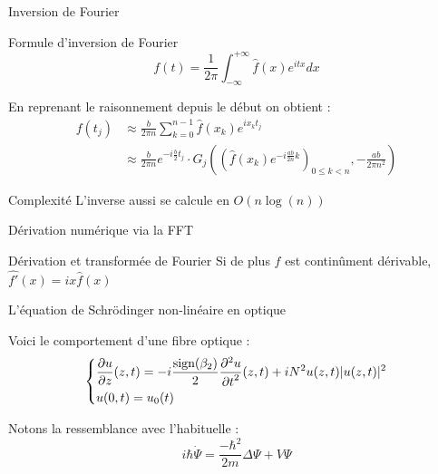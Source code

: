 \documentclass{beamer}
\begin{document}
\begin{frame}{Inversion de Fourier}
  \begin{exampleblock}{Formule d'inversion de Fourier}
$$ f(t) = \frac{1}{2\pi}\int_{-\infty}^{+\infty} \hat{f}(x)e^{itx}dx $$
  \end{exampleblock}

En reprenant le raisonnement depuis le début on obtient :
\begin{align*}
f(t_j)  &\approx \frac{b}{2\pi n}\sum_{k=0}^{n-1}\hat{f}(x_k)e^{i x_k t_j} \\
      &\approx \frac{b}{2\pi n} e^{-i\frac{b}{2}t_j}\cdot G_j\left(\left( \hat{f}(x_k)e^{-i\frac{ab}{2n}k}\right)_{0 \le k < n},  -\frac{ab}{2\pi n^2}\right) 
\end{align*}
\begin{exampleblock}{Complexité}
  L'inverse aussi se calcule en $O(n\log(n))$ 
\end{exampleblock}
\end{frame}

\begin{frame}{Dérivation numérique via la FFT}
  \begin{exampleblock}{Dérivation et transformée de Fourier}
    Si de plus $f$ est continûment dérivable, $\hat{f'}(x)= ix\hat{f}(x)$   
  \end{exampleblock}
    \begin{center}
\end{center}

\end{frame}

\begin{frame}{L'équation de Schrödinger non-linéaire en optique}

  Voici le comportement d'une fibre optique :
\begin{equation*}
  \begin{dcases*}
    \frac{\partial u}{\partial z}(z, t) = - i\frac{\text{sign}(\beta_2)}{2} \frac{\partial^2 u}{{\partial t}^2}(z, t) + iN^2u(z, t)|u(z, t)|^2 \\
    u(0, t) = u_0(t)
  \end{dcases*}
\end{equation*}

\vspace{0.8cm}
Notons la ressemblance avec l'habituelle :
\begin{equation*}
  i\hbar \dot{\Psi} = \frac{-\hbar^2}{2m}\Delta\Psi + V\Psi
\end{equation*}
\end{frame}
\end{document}
